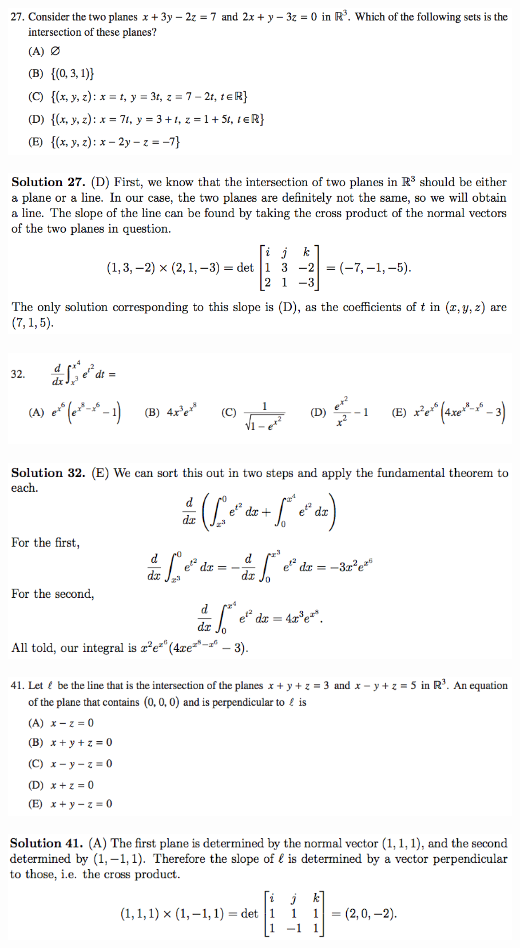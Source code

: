 \documentclass{article}
\begin{document}
\includegraphics[scale=0.5]{0568_27}

\includegraphics[scale=0.5]{0568_27s}

\includegraphics[scale=0.65]{1268_32}

\includegraphics[scale=0.65]{1268_32s}

\includegraphics[scale=0.65]{1268_41}

\includegraphics[scale=0.65]{1268_41s1}
\end{document}
